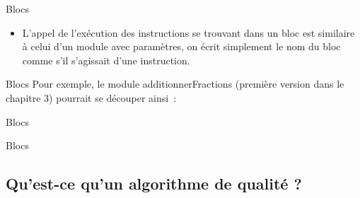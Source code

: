 \begin{frame}{Blocs}
	\begin{itemize}
	\item
	L’appel de l’exécution des instructions se trouvant
	dans un bloc est similaire à celui d’un module avec paramètres, on
	écrit simplement le nom du bloc comme s’il s’agissait d’une
	instruction.
	\end{itemize}
\end{frame}

\begin{frame}{Blocs}
	Pour exemple, le module additionnerFractions (première version dans le
	chapitre 3) pourrait se découper ainsi~:

	\bigskip
	
\end{frame}

\begin{frame}{Blocs}

	\bigskip
	
\end{frame}

\begin{frame}{Blocs}

	\bigskip
	
\end{frame}

\subsection{Qu'est-ce qu'un algorithme de qualité ?}

